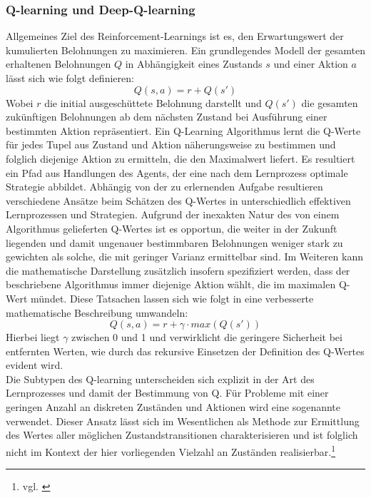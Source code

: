 \subsubsection{Q-learning und Deep-Q-learning}
Allgemeines Ziel des Reinforcement-Learnings ist es, den Erwartungswert der kumulierten Belohnungen zu maximieren. Ein grundlegendes Modell der gesamten erhaltenen Belohnungen \(Q\) in Abhängigkeit eines Zustands \(s\) und einer Aktion \(a\) lässt sich wie folgt definieren:
\[Q(s, a) = r + Q(s')\]
Wobei \(r\) die initial ausgeschüttete Belohnung darstellt und \(Q(s')\) die gesamten zukünftigen Belohnungen ab dem nächsten Zustand bei Ausführung einer bestimmten Aktion repräsentiert. Ein Q-Learning Algorithmus lernt die Q-Werte für jedes Tupel aus Zustand und Aktion näherungsweise zu bestimmen und folglich diejenige Aktion zu ermitteln, die den Maximalwert liefert. Es resultiert ein Pfad aus Handlungen des Agents, der eine nach dem Lernprozess optimale Strategie abbildet. Abhängig von der zu erlernenden Aufgabe resultieren verschiedene Ansätze beim Schätzen des Q-Wertes in unterschiedlich effektiven Lernprozessen und Strategien. Aufgrund der inexakten Natur des von einem Algorithmus gelieferten Q-Wertes ist es opportun, die weiter in der Zukunft liegenden und damit ungenauer bestimmbaren Belohnungen weniger stark zu gewichten als solche, die mit geringer Varianz ermittelbar sind. Im Weiteren kann die mathematische Darstellung zusätzlich insofern spezifiziert werden, dass der beschriebene Algorithmus immer diejenige Aktion wählt, die im maximalen Q-Wert mündet. Diese Tatsachen lassen sich wie folgt in eine verbesserte mathematische Beschreibung umwandeln:
\[Q(s, a) = r + \gamma \cdot max(Q(s'))\]
Hierbei liegt \(\gamma\) zwischen 0 und 1 und verwirklicht die geringere Sicherheit bei entfernten Werten, wie durch das rekursive Einsetzen der Definition des Q-Wertes evident wird.\\
Die Subtypen des Q-learning unterscheiden sich explizit in der Art des Lernprozesses und damit der Bestimmung von Q. Für Probleme mit einer geringen Anzahl an diskreten Zuständen und Aktionen wird eine sogenannte  verwendet. Dieser Ansatz lässt sich im Wesentlichen als  Methode zur Ermittlung des Wertes aller möglichen Zustandstransitionen charakterisieren und ist folglich nicht im Kontext der hier vorliegenden Vielzahl an Zuständen realisierbar.\footnote{vgl. \cite{general_Q_learning}}\\
